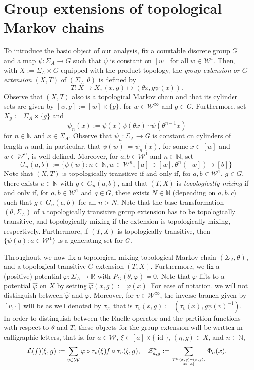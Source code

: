 \documentclass[10pt]{article}
\theoremstyle{mystyle}
\newcommand{\R}{\mathbb{R}}
\newcommand{\N}{\mathbb{N}}
\newcommand{\cZ}{\mathcal{Z}}
\newcommand{\cW}{\mathcal{W}}
\newcommand{\cL}{\mathcal{L}}
\newcommand{\te}{{\theta}}
\newcommand{\Sig}{{\Sigma}}
\newcommand{\1}{\mathbf{1}}
\newcommand{\with}{:}
\DeclareMathOperator{\id}{id}
\begin{document}
\section{Group extensions of topological Markov chains} \label{sec:Extensions by amenable groups}
To introduce the basic object of our analysis, fix a countable discrete  group $G$ and a map $\psi: \Sig_A \to G$ such that $\psi$ is constant on $[w]$ for all $w \in \cW^1$. Then, with $X:= \Sig_A \times G$ equipped with the product topology, 
the \emph{group extension or $G$-extension} $(X,T)$ of $(\Sig_A, \te)$ is defined by
\[ T: X\to X, (x,g) \mapsto (\te x, g \psi(x)).\]
Observe that $(X,T)$ also is a topological Markov chain and that its cylinder sets are given by $[w,g]:=[w]\times \{g\}$, for $w \in \cW^\infty$ and $g \in G$. Furthermore, set $X_g:= \Sig_A\times \{g\}$ and  
 \[\psi_{n}(x) := \psi(x)\psi(\te x) \cdots \psi(\te^{n-1}x)\]
  for $n \in \N$ and $x \in \Sig_A$. Observe that $\psi_{n}:\Sig_A \to G$ is constant on cylinders of length $n$ and, in particular, that $\psi(w) := \psi_{n}(x)$, for some $x \in [w]$ and $w \in \cW^n$, is well defined. Moreover, for $a,b \in \cW^1$ and  $n \in \N$, set
\[G_n(a,b):= \{ \psi(w) \with n \in \N, w\in \cW^n, [a]\supset[w], \te^n([w]) \supset [b]\}.\]
 Note that $(X,T)$ is {topologically transitive} if and only if, for $a,b \in \cW^1$, $g\in G$, there exists $n \in \N$ with $g\in G_n(a,b)$, and that $(T,X)$ is  \emph{topologically mixing} if and only if,  for $a,b \in \cW^1$ and  $g\in G$, there exists $N \in \N$ (depending on $a,b,g$) such that  $g\in G_n(a,b)$ for all $n>N$. Note that the base transformation $(\te,\Sig_A)$ of a topologically transitive group extension has to be topologically transitive, and topologically mixing if the extension is topologically mixing, respectively. Furthermore, if  $(T,X)$ is topologically transitive, then $\{\psi(a)\with a \in \cW^1\}$ is a generating set for $G$. 

Throughout, we now fix a topological mixing topological Markov chain $(\Sig_A, \te)$, and a topological transitive $G$-extension $(T,X)$. Furthermore, we fix a (positive) potential $\varphi:\Sig_A \to \R$ with $P_G(\te,\varphi)=0$. Note that $\varphi$ lifts to a potential  $\hat\varphi$ on $X$ by setting $\hat\varphi(x,g):= \varphi(x)$. For ease of notation, we will not distinguish between $\hat\varphi$ and $\varphi$. Moreover, for $v \in \cW^\infty$, the inverse branch given by $[v,\cdot]$ will be as well denoted by $\tau_v$, that is $\tau_v(x,g) := (\tau_v(x),g\psi(v)^{-1})$.
In order to distinguish between the Ruelle operator and the partition functions with respect to $\te$ and $T$, these objects for the group extension will be written in calligraphic letters, that is, for $a \in \cW$, $\xi \in [a]\times \{\id\}$, $(\eta,g)\in X$, and $n \in \N$,  
\begin{align*}
\cL(f)(\xi,g)  := \sum_{v \in \cW} \varphi\circ\tau_v(\xi) f\circ\tau_v(\xi,g), \quad 
\cZ_{a,g}^{n} := \sum_{ \genfrac{}{}{0pt}{}{T^n(x,g) =(x,g),}{x \in [a]}} \Phi_n(x).
\end{align*}
\end{document}
